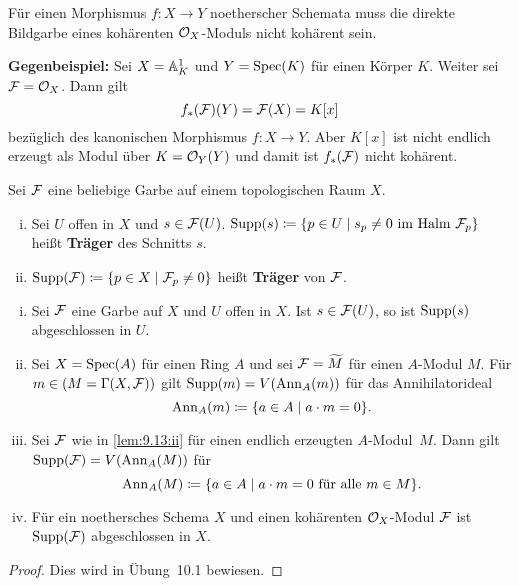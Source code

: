 \begin{bem}
\label{bem:9.11}
	Für einen Morphismus $f\colon X \to Y$ noetherscher Schemata muss die direkte Bildgarbe eines kohärenten $\mathcal{O}_X$-Moduls nicht kohärent sein.

	\textbf{Gegenbeispiel:} Sei $X=\mathbb {A}^1_K$ und $Y =\operatorname{Spec}(K)$ für einen Körper $K$. Weiter sei $\mathcal{F} = \mathcal{O}_X$. Dann gilt
	\[
		f_*(\mathcal{F})(Y) = \mathcal{F}(X) = K[x]
	\]
	bezüglich des kanonischen Morphismus $f\colon X \to Y$. Aber $K[x]$ ist nicht endlich erzeugt als Modul über $K=\mathcal{O}_Y(Y)$ und damit ist $f_*(\mathcal{F})$ nicht kohärent.
\end{bem}

\begin{defn}
\label{defn:9.12}
	Sei $\mathcal{F}$ eine beliebige Garbe auf einem topologischen Raum $X$. \begin{enumerate}[i)]
		\item\label{defn:9.12:i} Sei $U$ offen in $X$ und $s \in \mathcal{F}(U)$. $\operatorname{Supp}(s)\coloneqq \{p\in U \mid s_p\ne 0 \text{ im Halm } \mathcal{F}_p\}$ heißt \textbf{Träger} des Schnitts $s$.
		\item\label{defn:9.12:ii} $\operatorname{Supp}(\mathcal{F})\coloneqq \{ p \in X \mid \mathcal{F}_p \neq 0\}$ heißt \textbf{Träger} von $\mathcal{F}$.	
	\end{enumerate}
\end{defn}

\begin{lem}
\label{lem:9.13}
	\begin{enumerate}[i)]
		\item\label{lem:9.13:i} Sei $\mathcal{F}$ eine Garbe auf $X$ und $U$ offen in $X$. Ist $s \in \mathcal{F}(U)$, so ist $\operatorname{Supp}(s)$ abgeschlossen in $U$.
		\item\label{lem:9.13:ii} Sei $X=\operatorname{Spec}(A)$ für einen Ring $A$ und sei $\mathcal{F}=\widetilde{M}$ für einen $A$-Modul $M$. Für $m \in (M = \Gamma(X,\mathcal{F}))$ gilt $\operatorname{Supp}(m) = V(\operatorname{Ann}_A(m))$ für das Annihilatorideal
		\[
			\operatorname{Ann}_A(m) \coloneqq \{a \in A \mid a \cdot m = 0\}.
		\]
		\item\label{lem:9.13:iii} Sei $\mathcal{F}$ wie in \ref{lem:9.13:ii} für einen endlich erzeugten $A$-Modul~$M$. Dann gilt $\operatorname{Supp}(\mathcal{F})=V(\operatorname{Ann}_A(M))$ für
		\[
			\operatorname{Ann}_A(M) \coloneqq \{a \in A \mid a \cdot m = 0 \text{ für alle } m \in M\}.
		\]
		\item\label{lem:9.13:iv} Für ein noethersches Schema $X$ und einen kohärenten $\mathcal{O}_X$-Modul $\mathcal{F}$ ist $\operatorname{Supp}(\mathcal{F})$ abgeschlossen in $X$.
	\end{enumerate}
	\begin{proof}
		Dies wird in Übung~10.1 bewiesen. 
	\end{proof}
\end{lem}

